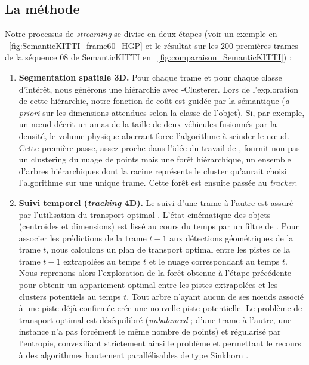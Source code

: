 \subsection{La méthode}
Notre processus de \emph{streaming} se divise en deux étapes (voir un exemple en \Fig~\ref{fig:SemanticKITTI_frame60_HGP} et le résultat sur les 200 premières trames de la séquence 08 de SemanticKITTI en \Fig~\ref{fig:comparaison_SemanticKITTI}) :
\begin{enumerate}
    \item \textbf{Segmentation spatiale 3D.} Pour chaque trame et pour chaque classe d'intérêt, nous générons une hiérarchie avec \HGP-Clusterer. Lors de l'exploration de cette hiérarchie, notre fonction de coût est guidée par la sémantique (\emph{a priori} sur les dimensions attendues selon la classe de l'objet). Si, par exemple, un nœud décrit un amas de la taille de deux véhicules fusionnés par la densité, le volume physique aberrant force l'algorithme à scinder le nœud.
    Cette première passe, assez proche dans l'idée du travail de  \etal \cite{Sautier2025}, fournit non pas un clustering du nuage de points mais une forêt hiérarchique, un ensemble d'arbres hiérarchiques dont la racine représente le cluster qu'aurait choisi l'algorithme sur une unique trame. Cette forêt est ensuite passée au \emph{tracker}. 
    \item \textbf{Suivi temporel (\emph{tracking} 4D).} Le suivi d'une trame à l'autre est assuré par l'utilisation du transport optimal \cite{Peyre2019}. L'état cinématique des objets (centroïdes et dimensions) est lissé au cours du temps par un filtre de  \cite{FiltreKalman}. Pour associer les prédictions de la trame $t-1$ aux détections géométriques de la trame $t$, nous calculons un plan de transport optimal entre les pistes de la trame $t-1$ extrapolées au temps $t$ et le nuage correspondant au temps $t$. Nous reprenons alors l'exploration de la forêt obtenue à l'étape précédente pour obtenir un appariement optimal entre les pistes extrapolées et les clusters potentiels au temps $t$. Tout arbre n'ayant aucun de ses nœuds associé à une piste déjà confirmée crée une nouvelle piste potentielle. Le problème de transport optimal est déséquilibré \cite{Chizat2018UOT} (\emph{unbalanced} ; d'une trame à l'autre, une instance n'a pas forcément le même nombre de points) et régularisé par l'entropie, convexifiant strictement ainsi le problème et permettant le recours à des algorithmes hautement parallélisables de type Sinkhorn \cite{Cuturi2013Sinkhorn}.
\end{enumerate}

